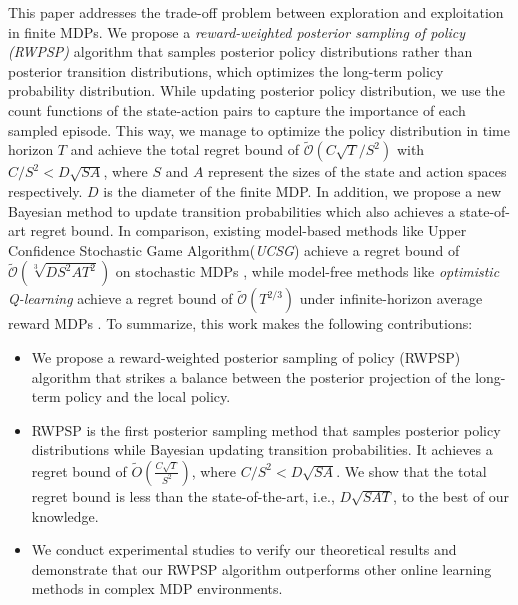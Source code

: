\documentclass{article}
\theoremstyle{plain}
\theoremstyle{definition}
\theoremstyle{remark}
\begin{document}
This paper addresses the trade-off problem between exploration and exploitation in finite MDPs. We propose a \emph{reward-weighted posterior sampling of policy (RWPSP)} algorithm that samples posterior policy distributions rather than posterior transition distributions, which optimizes the long-term policy probability distribution. While updating posterior policy distribution, we use the count functions of the state-action pairs to capture the importance of each sampled episode. This way, we manage to optimize the policy distribution in time horizon $T$ and achieve the total regret bound of $\tilde{\mathcal{O}}(C\sqrt{T}/S^{2})$ with $C/S^{2} < D\sqrt{SA}$, where $S$ and $A$ represent the sizes of the state and action spaces respectively. $D$ is the diameter of the finite MDP. In addition, we propose a new Bayesian method to update transition probabilities which also achieves a state-of-art regret bound. In comparison, existing model-based methods like Upper Confidence Stochastic Game Algorithm(\emph{UCSG}) achieve a regret bound of $\tilde{\mathcal{O}}\left(\sqrt[3]{D S^{2} A T^{2}}\right)$ on stochastic MDPs \citep{NIPS2017_36e729ec}, while model-free methods like \emph{optimistic Q-learning} achieve a regret bound of $\tilde{\mathcal{O}}\left(T^{2 / 3}\right)$ under infinite-horizon average reward MDPs \citep{wei2020model}. To summarize, this work makes the following contributions:
\begin{itemize}
    \item We propose a reward-weighted posterior sampling of policy (RWPSP) algorithm that strikes a balance between the posterior projection of the long-term policy and the local policy. 
    \item RWPSP is the first posterior sampling method that samples posterior policy distributions while Bayesian updating  transition probabilities. It achieves a regret bound of $\tilde{O}(\frac{C\sqrt{T}}{S^{2}})$, where $C/S^{2} < D\sqrt{SA}$. We show that the total regret bound is less than the state-of-the-art, i.e., $D\sqrt{SAT}$, to the best of our knowledge.
    \item We conduct experimental studies to verify our theoretical results and demonstrate that our RWPSP algorithm outperforms other online learning methods in complex MDP environments. 
\end{itemize}
\end{document}
